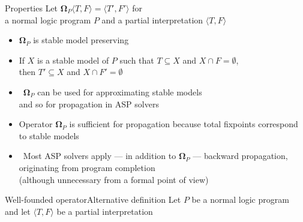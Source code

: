 \begin{frame}{Properties}
  Let ${\mathbf{\Omega}}_P\langle T,F \rangle=\langle T',F'\rangle$
  for\\
  a normal logic program $P$ and
  a partial interpretation $\langle T,F \rangle$
  \smallskip
  \begin{itemize}
  \item<2-> ${\mathbf{\Omega}}_P$ is \alert{stable model preserving}
  \item<2-> [] If $X$ is a stable model of $P$ such that $T\subseteq X$ and $X\cap F=\emptyset$,
    \\ then $T'\subseteq X$ and $X\cap F'=\emptyset$
    \smallskip
  \item<3->  \ ${\mathbf{\Omega}}_P$ can be used for approximating stable models
    \\ and so for propagation in ASP solvers
    \smallskip
  \item <4-> [] %
    Operator ${\mathbf{\Omega}}_P$ is sufficient for propagation
    because total fixpoints correspond to stable models
    \medskip
  \item<5->  \
    Most ASP solvers apply --- in addition to ${\mathbf{\Omega}}_P$ --- \alert{backward propagation},
    originating from program completion
    \\
    (although unnecessary from a formal point of view)
  \end{itemize}
\end{frame}
\begin{frame}{Well-founded operator}{Alternative definition}
  Let $P$ be a normal logic program\\
  and let $\langle T,F \rangle$ be a partial interpretation
  \medskip
  \nocite{truszczynski18a}
\end{frame}
%
